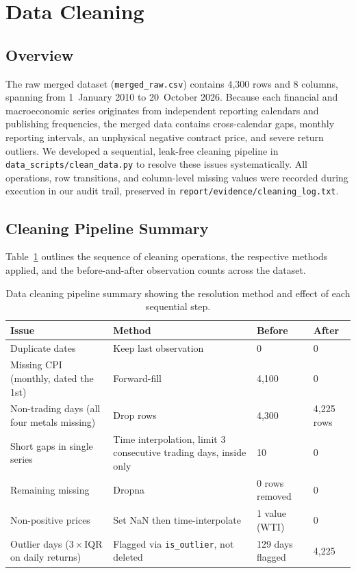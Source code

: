 \section{Data Cleaning}
\label{sec:cleaning}

\subsection{Overview}

The raw merged dataset (\texttt{merged\_raw.csv}) contains 4,300 rows and 8 columns, spanning from 1~January 2010 to 20~October 2026. Because each financial and macroeconomic series originates from independent reporting calendars and publishing frequencies, the merged data contains cross-calendar gaps, monthly reporting intervals, an unphysical negative contract price, and severe return outliers. We developed a sequential, leak-free cleaning pipeline in \texttt{data\_scripts/clean\_data.py} to resolve these issues systematically. All operations, row transitions, and column-level missing values were recorded during execution in our audit trail, preserved in \texttt{report/evidence/cleaning\_log.txt}.

\subsection{Cleaning Pipeline Summary}

Table~\ref{tab:cleaning_summary} outlines the sequence of cleaning operations, the respective methods applied, and the before-and-after observation counts across the dataset.

\begin{table}[H]
  \centering
  \small
  \begin{tabular}{p{}p{}p{}p{}}
    \toprule
    Issue & Method & Before & After \\
    \midrule
    Duplicate dates & Keep last observation & 0 & 0 \\
    Missing CPI (monthly, dated the 1st) & Forward-fill & 4,100 & 0 \\
    Non-trading days (all four metals missing) & Drop rows & 4,300 & 4,225 rows \\
    Short gaps in single series & Time interpolation, limit 3 consecutive trading days, inside only & 10 & 0 \\
    Remaining missing & Dropna & 0 rows removed & 0 \\
    Non-positive prices & Set NaN then time-interpolate & 1 value (WTI) & 0 \\
    Outlier days ($3\times\text{IQR}$ on daily returns) & Flagged via \texttt{is\_outlier}, not deleted & 129 days flagged & 4,225 \\
    \bottomrule
  \end{tabular}
  \caption{Data cleaning pipeline summary showing the resolution method and effect of each sequential step.}
  \label{tab:cleaning_summary}
\end{table}


